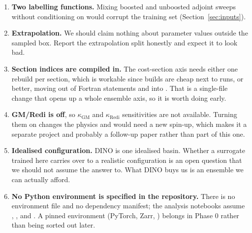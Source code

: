 \begin{enumerate}
        Two caveats. This is one run at one viscosity setting, and the
         members exist because some configurations do
        misbehave, so the measurement should be repeated across the viscosity
        range before anyone leans on it. And decay has its own limit: once the
        signal has decayed into the noise floor the label is uninformative even
        though it is finite. Either way, $\tau_{\max}$ has to be established
        with directional-derivative checks at a sequence of lead times, before
        the ensemble is generated, because it sets the cost.
  \item \textbf{Two labelling functions.} Mixing boosted and unboosted adjoint
        sweeps without conditioning on  would corrupt the
        training set (Section~\ref{sec:inputs}).
  \item \textbf{Extrapolation.} We should claim nothing about parameter values
        outside the sampled box. Report the extrapolation split honestly and
        expect it to look bad.
  \item \textbf{Section indices are compiled in.} The cost-section axis needs
        either one rebuild per section, which is workable since builds are
        cheap next to runs, or better, moving
         out of Fortran 
        statements and into . That is a single-file change that
        opens up a whole ensemble axis, so it is worth doing early.
  \item \textbf{GM/Redi is off}, so $\kappa_{\mathrm{GM}}$ and
        $\kappa_{\mathrm{Redi}}$ sensitivities are not available. Turning them
        on changes the physics and would need a new spin-up, which makes it a
        separate project and probably a follow-up paper rather than part of
        this one.
  \item \textbf{Idealised configuration.} DINO is one idealised basin. Whether
        a surrogate trained here carries over to a realistic configuration is
        an open question that we should not assume the answer to. What DINO
        buys us is an ensemble we can actually afford.
  \item \textbf{No Python environment is specified in the repository.} There is
        no environment file and no dependency manifest; the analysis notebooks
        assume , ,  and
        . A pinned environment (PyTorch, Zarr, )
        belongs in Phase 0 rather than being sorted out later.
\end{enumerate}

